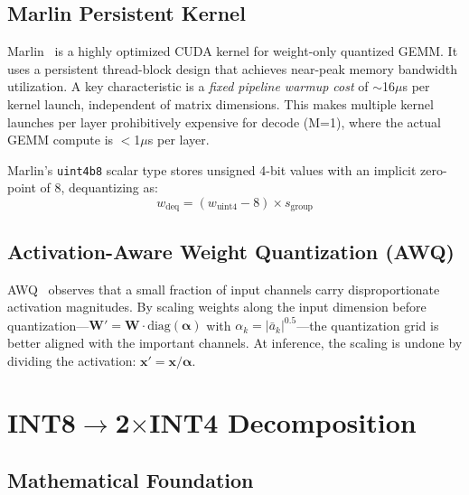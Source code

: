 \documentclass[11pt,a4paper]{article}
\begin{document}
\subsection{Marlin Persistent Kernel}

Marlin~\cite{frantar2024marlin} is a highly optimized CUDA kernel for weight-only quantized GEMM. It uses a persistent thread-block design that achieves near-peak memory bandwidth utilization. A key characteristic is a \emph{fixed pipeline warmup cost} of $\sim$16$\mu$s per kernel launch, independent of matrix dimensions. This makes multiple kernel launches per layer prohibitively expensive for decode (M=1), where the actual GEMM compute is $<$1$\mu$s per layer.

Marlin's \texttt{uint4b8} scalar type stores unsigned 4-bit values with an implicit zero-point of 8, dequantizing as:
\begin{equation}
    w_{\text{deq}} = (w_{\text{uint4}} - 8) \times s_{\text{group}}
\end{equation}

\subsection{Activation-Aware Weight Quantization (AWQ)}

AWQ~\cite{lin2024awq} observes that a small fraction of input channels carry disproportionate activation magnitudes. By scaling weights along the input dimension before quantization---$\mathbf{W}' = \mathbf{W} \cdot \text{diag}(\boldsymbol{\alpha})$ with $\alpha_k = |\bar{a}_k|^{0.5}$---the quantization grid is better aligned with the important channels. At inference, the scaling is undone by dividing the activation: $\mathbf{x}' = \mathbf{x} / \boldsymbol{\alpha}$.


\section{INT8$\to$2$\times$INT4 Decomposition}
\label{sec:decomposition}

\subsection{Mathematical Foundation}
\end{document}
